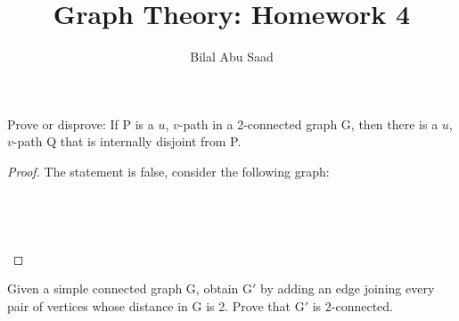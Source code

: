\documentclass[12pt]{article}
\newenvironment{problem}[2][Problem]{\begin{trivlist}
\item[\hskip\labelsep{\bfseries #1}\hskip\labelsep{\bfseries #2.}]}{\end{trivlist}}
\begin{document}
\title{Graph Theory: Homework 4}
\author{Bilal Abu Saad}
\maketitle
 
\begin{problem}{1}
Prove or disprove: If P is a $u$, $v$-path in a 2-connected graph G, then there
is a $u$, $v$-path Q that is internally disjoint from P.
\end{problem}
 
\begin{proof}
  The statement is false, consider the following graph:\\
  \\
  \\
  \\
  \\
\end{proof}

\begin{problem}{2}
  Given a simple connected graph G, obtain G$'$ by adding an edge joining every
  pair of vertices whose distance in G is 2. Prove that G$'$ is 2-connected.
\end{problem}
\end{document}
